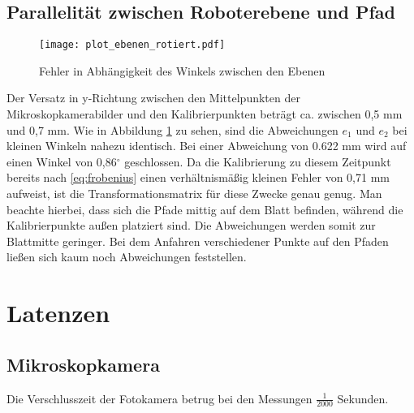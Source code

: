\subsection{Parallelität zwischen Roboterebene und Pfad}

\begin{figure}[h]
	\centering
	\texttt{[image: plot\_ebenen\_rotiert.pdf]}
	\caption{Fehler in Abhängigkeit des Winkels zwischen den Ebenen}
	\label{fig:Plot Fehler Ebenen rotiert}
\end{figure}

Der Versatz in y-Richtung zwischen den Mittelpunkten der Mikroskopkamerabilder und den Kalibrierpunkten beträgt ca. zwischen 0,5 mm und 0,7 mm.
Wie in Abbildung \ref{fig:Plot Fehler Ebenen rotiert} zu sehen, sind die Abweichungen $e_{1}$ und $e_{2}$ bei kleinen Winkeln nahezu identisch.
Bei einer Abweichung von 0.622 mm wird auf einen Winkel von 0,86$^{\circ}$ geschlossen. Da die Kalibrierung zu diesem Zeitpunkt bereits nach \eqref{eq:frobenius} einen verhältnismäßig kleinen Fehler von 0,71 mm aufweist, ist die Transformationsmatrix für diese Zwecke genau genug. Man beachte hierbei, dass sich die Pfade mittig auf dem Blatt befinden, während die Kalibrierpunkte außen platziert sind. Die Abweichungen werden somit zur Blattmitte geringer. Bei dem Anfahren verschiedener Punkte auf den Pfaden ließen sich kaum noch Abweichungen feststellen.



\section{Latenzen}
\subsection{Mikroskopkamera}
Die Verschlusszeit der Fotokamera betrug bei den Messungen $\frac{1}{2000}$ Sekunden.

